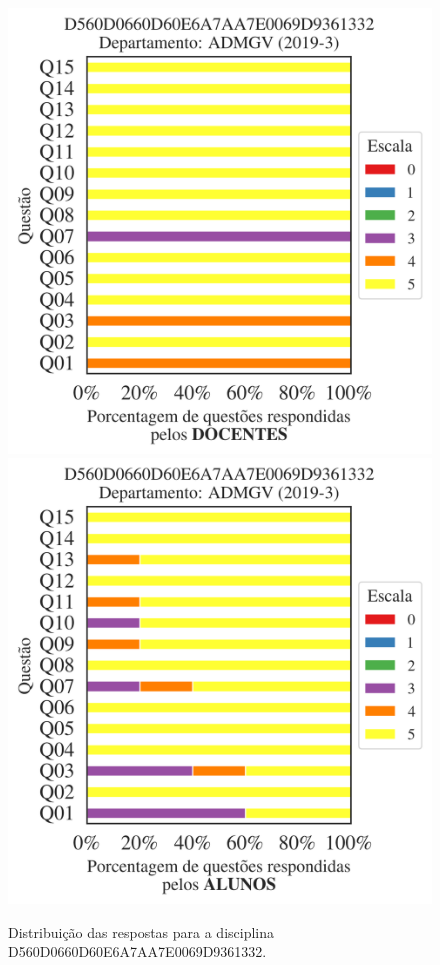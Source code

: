 \documentclass[a4paper,10pt]{article}
\begin{document}
\begin{figure}[h]
\centering
\includegraphics[width=0.485\linewidth]{analise_disciplina_departamento_ADMGV_D560D0660D60E6A7AA7E0069D9361332_docentes.png}
\includegraphics[width=0.485\linewidth]{analise_disciplina_departamento_ADMGV_D560D0660D60E6A7AA7E0069D9361332_alunos.png}
\caption{\label{fig:analise_geral_departamento}                Distribuição das respostas para a disciplina D560D0660D60E6A7AA7E0069D9361332. }
\end{figure}
\end{document}
